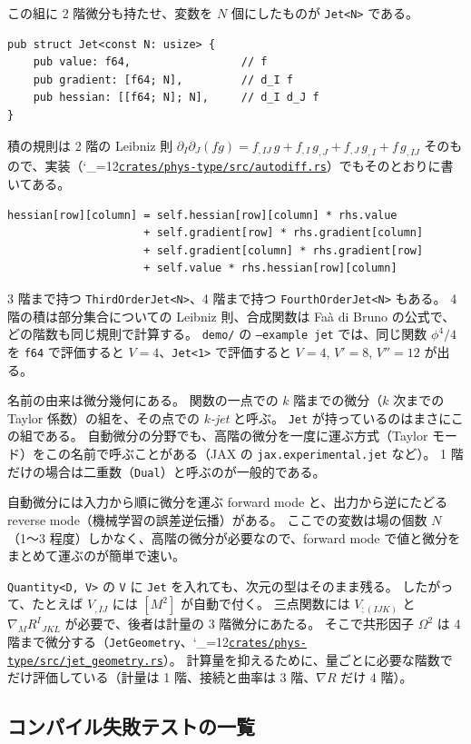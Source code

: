 \documentclass[a4paper,11pt]{ltjsarticle}
\newcommand{\code}[1]{\texttt{#1}}
\newcommand{\repourl}{https://github.com/inuverse44/phys-type-dev}
\newcommand{\reporev}{b1fea87}
\newcommand{\repo}{\begingroup\catcode`\_=12\relax\repoaux}
\newcommand{\repoaux}[1]{\href{\repourl/blob/\reporev/#1}{\nolinkurl{#1}}\endgroup}
\begin{document}
この組に 2 階微分も持たせ、変数を $N$ 個にしたものが \code{Jet<N>} である。
\begin{lstlisting}
pub struct Jet<const N: usize> {
    pub value: f64,                 // f
    pub gradient: [f64; N],         // d_I f
    pub hessian: [[f64; N]; N],     // d_I d_J f
}
\end{lstlisting}
積の規則は 2 階の Leibniz 則 $\partial_I\partial_J(fg)=f_{,IJ}\,g+f_{,I}\,g_{,J}+f_{,J}\,g_{,I}+f\,g_{,IJ}$ そのもので、実装（\repo{crates/phys-type/src/autodiff.rs}）でもそのとおりに書いてある。
\begin{lstlisting}
hessian[row][column] = self.hessian[row][column] * rhs.value
                     + self.gradient[row] * rhs.gradient[column]
                     + self.gradient[column] * rhs.gradient[row]
                     + self.value * rhs.hessian[row][column]
\end{lstlisting}
3 階まで持つ \code{ThirdOrderJet<N>}、4 階まで持つ \code{FourthOrderJet<N>} もある。
4 階の積は部分集合についての Leibniz 則、合成関数は Faà di Bruno の公式で、どの階数も同じ規則で計算する。
\code{demo/} の \code{--example jet} では、同じ関数 $\phi^4/4$ を \code{f64} で評価すると $V=4$、\code{Jet<1>} で評価すると $V=4$, $V'=8$, $V''=12$ が出る。

名前の由来は微分幾何にある。
関数の一点での $k$ 階までの微分（$k$ 次までの Taylor 係数）の組を、その点での \emph{$k$-jet} と呼ぶ。
\code{Jet} が持っているのはまさにこの組である。
自動微分の分野でも、高階の微分を一度に運ぶ方式（Taylor モード）をこの名前で呼ぶことがある（JAX の \code{jax.experimental.jet} など）。
1 階だけの場合は二重数（\code{Dual}）と呼ぶのが一般的である。

自動微分には入力から順に微分を運ぶ forward mode と、出力から逆にたどる reverse mode（機械学習の誤差逆伝播）がある。
ここでの変数は場の個数 $N$（1〜3 程度）しかなく、高階の微分が必要なので、forward mode で値と微分をまとめて運ぶのが簡単で速い。

\code{Quantity<D, V>} の \code{V} に \code{Jet} を入れても、次元の型はそのまま残る。
したがって、たとえば $V_{,IJ}$ には $[M^2]$ が自動で付く。
三点関数には $V_{;(IJK)}$ と $\nabla_MR^I{}_{JKL}$ が必要で、後者は計量の 3 階微分にあたる。
そこで共形因子 $\Omega^2$ は 4 階まで微分する（\code{JetGeometry}、\repo{crates/phys-type/src/jet_geometry.rs}）。
計算量を抑えるために、量ごとに必要な階数でだけ評価している（計量は 1 階、接続と曲率は 3 階、$\nabla R$ だけ 4 階）。

\subsection{コンパイル失敗テストの一覧}
\label{sec:compile-fail}
\end{document}
